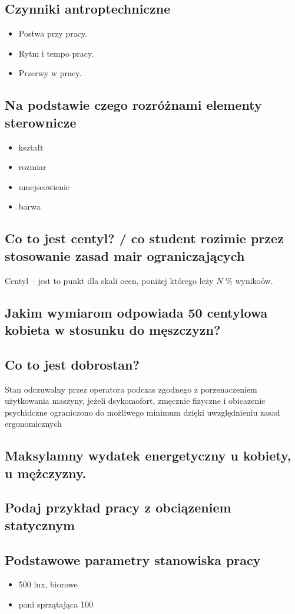 \documentclass[11pt]{article}
\begin{document}
\subsection{Czynniki antroptechniczne}
\label{sec:org63a829f}
\begin{itemize}
\item Postwa przy pracy.
\item Rytm i tempo pracy.
\item Przerwy w pracy.
\end{itemize}
\subsection{Na podstawie czego rozróżnami elementy sterownicze}
\label{sec:org6875725}
\begin{itemize}
\item kształt
\item rozmiar
\item umejscowienie
\item barwa
\end{itemize}
\subsection{Co to jest centyl? / co student rozimie przez stosowanie zasad mair ograniczających}
\label{sec:org31ca647}
Centyl -- jest to punkt dla skali ocen, poniżej którego leży \(N\) \% wynikoów.
\subsection{Jakim wymiarom odpowiada 50 centylowa kobieta w stosunku do męszczyzn?}
\label{sec:org05c3595}
\subsection{Co to jest dobrostan?}
\label{sec:org5453cef}
Stan odczuwalny przez operatora podczas zgodnego z porzenaczeniem użytkowania maszyny, jeżeli dsykomofort, zmęcznie fizyczne i obicazenie psychidczne ograniczono do możliwego minimum dzięki uwzględnieniu zasad ergonomicznych
\subsection{Maksylamny wydatek energetyczny u kobiety, u mężczyzny.}
\label{sec:orgd33ee1f}
\subsection{Podaj przykład pracy z obciązeniem statycznym}
\label{sec:orgc6b39c8}
\subsection{Podstawowe parametry stanowiska pracy}
\label{sec:orgb2cc76b}
\begin{itemize}
\item 500 lux, biorowe
\item pani sprzątająca 100
\end{itemize}
\end{document}
